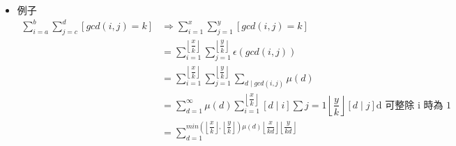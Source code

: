 \begin{itemize}
\item 例子
$$ \begin{aligned}
    \sum_{i = a}^{b} \sum_{j = c}^{d} [gcd(i, j) = k]
    &\Rightarrow \sum_{i = 1}^{x} \sum_{j = 1}^{y} [gcd(i, j) = k]\\
    &= \sum_{i = 1}^{\left\lfloor\dfrac {x}{k} \right\rfloor} \sum_{j = 1}^{\left\lfloor\dfrac {y}{k} \right\rfloor} \epsilon(gcd(i, j))\\
    &= \sum_{i = 1}^{\left\lfloor\dfrac {x}{k} \right\rfloor} \sum_{j = 1}^{\left\lfloor\dfrac {y}{k} \right\rfloor} \sum_{d \mid gcd(i, j)} \mu(d)\\
    &= \sum_{d = 1}^{\infty} \mu(d) \sum_{i = 1}^{\left\lfloor\dfrac {x}{k} \right\rfloor} [d \mid i] \sum {j = 1}{\left\lfloor\dfrac {y}{k} \right\rfloor} [d \mid j] \text{d 可整除 i 時為 1}\\
    &= \sum_{d = 1}^{min(\left\lfloor\dfrac {x}{k} \right\rfloor, \left\lfloor\dfrac {y}{k} \right\rfloor) \mu(d) \left\lfloor\dfrac {x}{kd} \right\rfloor \left\lfloor\dfrac {y}{kd} \right\rfloor}
\end{aligned} $$
\end{itemize}